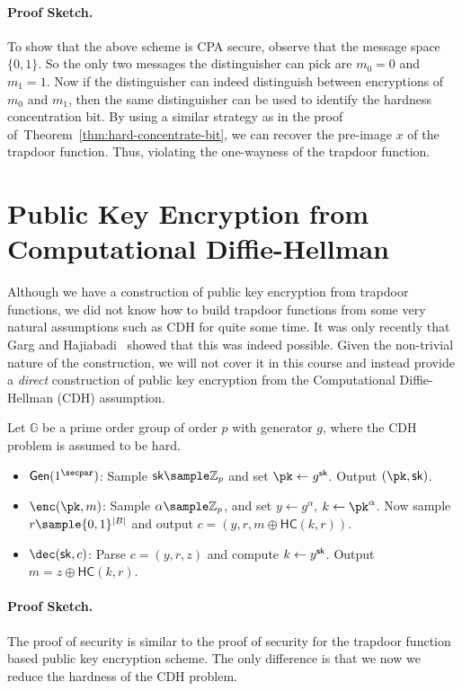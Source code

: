 \documentclass[12pt]{tufte-book}
\newcommand{\gen}{\mathsf{Gen}}
\begin{document}
\paragraph{Proof Sketch.} To show that the above scheme is CPA secure, observe that the message space $\{0,1\}$. So the only two messages the distinguisher can pick are $m_0=0$ and $m_1=1$. Now if the distinguisher can indeed distinguish between encryptions of $m_0$ and $m_1$, then the same distinguisher can be used to identify the hardness concentration bit. By using a similar strategy as in the proof of~Theorem~\ref{thm:hard-concentrate-bit}, we can recover the pre-image $x$ of the trapdoor function. Thus, violating the one-wayness of the trapdoor function.

\section{Public Key Encryption from Computational Diffie-Hellman}
Although we have a construction of public key encryption from trapdoor functions, we did not know how to build trapdoor functions from some very natural assumptions such as CDH for quite some time. It was only recently that Garg and Hajiabadi~\cite{C:GarHaj18} 
showed that this was indeed possible. Given the non-trivial nature of the construction, we will not cover it in this course and instead provide a \emph{direct} construction of public key encryption from the Computational Diffie-Hellman (CDH) assumption.

Let $\mathbb{G}$ be a prime order group of order $p$ with generator $g$, where the CDH problem is assumed to be hard.
\begin{itemize}
    \item $\gen(1^\secpar)$: Sample $\sk \sample \mathbb{Z}_p$ and set $\pk \gets g^\sk$. Output $(\pk, \sk)$.
    \item $\enc(\pk, m)$: Sample $\alpha \sample \mathbb{Z}_p$, and set $y \gets g^\alpha$, $k \gets \pk^\alpha$. Now sample $r \sample \{0,1\}^{|B|}$ and output $c = (y, r, m \oplus \mathsf{HC}(k, r))$.
    \item $\dec(\sk, c)$: Parse $c = (y, r, z)$ and compute $k \gets y^{\mathsf{sk}}$. Output $m = z \oplus \mathsf{HC}(k, r)$.
\end{itemize}

\paragraph{Proof Sketch.} The proof of security is similar to the proof of security for the trapdoor function based public key encryption scheme. The only difference is that we now we reduce the hardness of the CDH problem.
\end{document}
